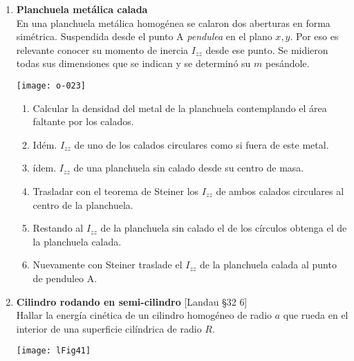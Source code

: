 \documentclass[11pt, spanish, a4paper, twoside]{article}
\begin{document}
\begin{enumerate}
	\item 
		\begin{minipage}[t][4cm]{0.5\textwidth}
			\textbf{Planchuela metálica calada}\\
			En una planchuela metálica homogénea se calaron dos aberturas en forma simétrica.
			Suspendida desde el punto A \emph{pendulea} en el plano \(x,y\).
			Por eso es relevante conocer su momento de inercia \(I_{zz}\) desde ese punto.
			Se midieron todas sus dimensiones que se indican y se determinó su $m$ pesándole. 
		\end{minipage}
		\begin{minipage}[c][2cm][t]{0.45\textwidth}
			\texttt{[image: o-023]}
		\end{minipage}
			\begin{enumerate}
				\item Calcular la densidad del metal de la planchuela contemplando el área faltante por los calados.
				\item Idém. \(I_{zz}\) de uno de los calados circulares como si fuera de este metal.
				\item ídem. \(I_{zz}\) de una planchuela sin calado desde su centro de masa.
				\item Trasladar con el teorema de Steiner los \(I_{zz}\) de ambos calados circulares al centro de la planchuela.
				\item Restando al \(I_{zz}\) de la planchuela sin calado el de los círculos obtenga el de la planchuela calada.
				\item Nuevamente con Steiner traslade el \(I_{zz}\) de la planchuela calada al punto de penduleo A.
			\end{enumerate}


	\item 
		\begin{minipage}[t][2.3cm]{0.65\textwidth}
			\textbf{Cilindro rodando en semi-cilindro} [Landau \S 32 6]\\
			Hallar la energía cinética de un cilindro homogéneo de radio \(a\) que rueda en el interior de una superficie cilíndrica de radio \(R\).
		\end{minipage}
		\begin{minipage}[c][1cm][t]{0.3\textwidth}
			\texttt{[image: lFig41]}
		\end{minipage}



\end{enumerate}
\end{document}

